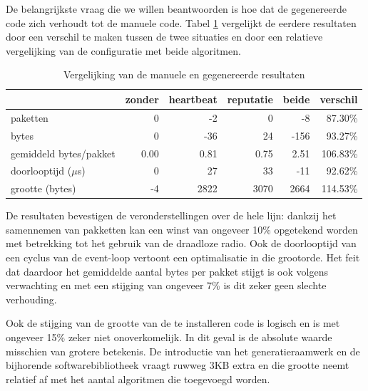 De belangrijkste vraag die we willen beantwoorden is hoe dat de gegenereerde
code zich verhoudt tot de manuele code. Tabel \ref{tbl:comparison} vergelijkt
de eerdere resultaten door een verschil te maken tussen de twee situaties en
door een relatieve vergelijking van de configuratie met beide algoritmen.

\begin{table}[H]
  \centering
  \begin{tabular}{l|r|rrrr}
  \hline
  & zonder & heartbeat & reputatie & beide & verschil\\
  \hline
  \hline

paketten               &  0    &   -2    &    0    &   -8    & \cellcolor{green!25} 87.30\% \\
bytes                  &  0    &  -36    &   24    & -156    & \cellcolor{green!25} 93.27\% \\
gemiddeld bytes/pakket &  0.00 &    0.81 &    0.75 &    2.51 & \cellcolor{red!25}  106.83\% \\
doorlooptijd ($\mu$s)  &  0    &   27    &   33    &  -11    & \cellcolor{green!25} 92.62\% \\
grootte (bytes)        & -4    & 2822    & 3070    & 2664    & \cellcolor{red!25}  114.53\% \\

  \hline
  \end{tabular}
  \caption{Vergelijking van de manuele en gegenereerde resultaten}
  \label{tbl:comparison}
\end{table}

De resultaten bevestigen de veronderstellingen over de hele lijn: dankzij het
samennemen van pakketten kan een winst van ongeveer 10\% opgetekend worden met
betrekking tot het gebruik van de draadloze radio. Ook de doorlooptijd van een
cyclus van de event-loop vertoont een optimalisatie in die grootorde. Het feit
dat daardoor het gemiddelde aantal bytes per pakket stijgt is ook volgens
verwachting en met een stijging van ongeveer 7\% is dit zeker geen slechte
verhouding.

Ook de stijging van de grootte van de te installeren code is logisch en is met
ongeveer 15\% zeker niet onoverkomelijk. In dit geval is de absolute waarde
misschien van grotere betekenis. De introductie van het generatieraamwerk en de
bijhorende softwarebibliotheek vraagt ruwweg 3KB extra en die grootte neemt
relatief af met het aantal algoritmen die toegevoegd worden.

\vspace{-3mm}

